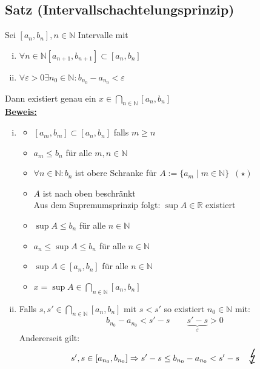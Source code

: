 \subsection{Satz (Intervallschachtelungsprinzip)} %
\label{sub:satz_intervallschachtelungsprinzip_}
Sei $[a_n , b_n], n \in \mathds{N} $ Intervalle mit
\begin{enumerate}[(i)]
	\item $\forall n \in \mathds{N} [a_{n+1}, b_{n+1}] \subset [a_{n}, b_{n}]$
	\item $\forall \varepsilon >0 \exists n_0 \in \mathds{N} : b_{n_0} - a_{n_0} < \varepsilon$
\end{enumerate}
Dann existiert genau ein $x \in \underset{n \in \mathds{N}}{\bigcap} [a_n , b_n]$ \\
\underline{\textbf{Beweis:}}
\begin{enumerate}[(i)]
	\item \begin{itemize}[$\Rightarrow$]
		\item $[a_m , b_m] \subset [a_n , b_n]$ falls $m \geq n$
		\item $a_m \leq b_n$ für alle $m,n \in \mathds{N}$
		\item $\forall n \in \mathds{N} : b_n$ ist obere Schranke für 
		$A:= \{ a_m \mid m  \in \mathds{N}\} \enspace (\star)$
		\item $A$ ist nach oben beschränkt \\
		Aus dem Supremumsprinzip folgt: $\sup A \in \mathds{R}$ existiert
		\item $\sup A \leq b_n$ für alle $n \in \mathds{N} $
		\item $a_n \leq \sup A \leq b_n$ für alle $n \in \mathds{N} $
		\item $\sup A \in [a_n, b_n]$ für alle $n \in \mathds{N} $
		\item $x= \sup A \in \underset{n \in \mathds{N}}{\bigcap} [a_n, b_n]$
	\end{itemize}
	\item Falls $s, s' \in \underset{n \in \mathds{N}}{\bigcap} [a_n ,b_n]$ mit $s < s'$ so existiert $n_0 \in \mathds{N}$ mit:
	\[
		b_{n_0} - a_{n_0} <  s' -s \quad \quad \underbrace{s' -s}_{\varepsilon} > 0
	\]
	Andererseit gilt: 
	\[
		s',s \in [a_{n_0}, b_{n_0}] \\
		\Rightarrow s' -s \leq b_{n_0} -a_{n_0} < s' -s \quad \text{\huge $\lightning$}
	\]
\end{enumerate}

